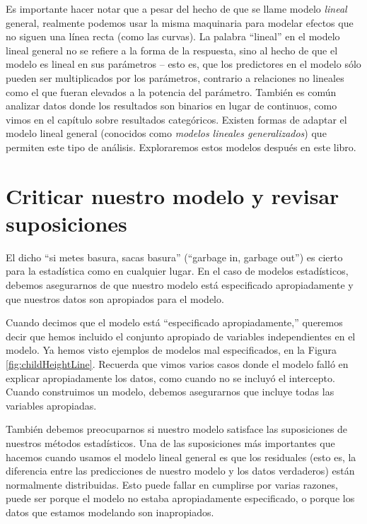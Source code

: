 \documentclass[
  12pt,
]{book}
\begin{document}
Es importante hacer notar que a pesar del hecho de que se llame modelo \emph{lineal} general, realmente podemos usar la misma maquinaria para modelar efectos que no siguen una línea recta (como las curvas). La palabra ``lineal'' en el modelo lineal general no se refiere a la forma de la respuesta, sino al hecho de que el modelo es lineal en sus parámetros -- esto es, que los predictores en el modelo sólo pueden ser multiplicados por los parámetros, contrario a relaciones no lineales como el que fueran elevados a la potencia del parámetro. También es común analizar datos donde los resultados son binarios en lugar de continuos, como vimos en el capítulo sobre resultados categóricos. Existen formas de adaptar el modelo lineal general (conocidos como \emph{modelos lineales generalizados}) que permiten este tipo de análisis. Exploraremos estos modelos después en este libro.

\hypertarget{model-criticism}{%
\section{Criticar nuestro modelo y revisar suposiciones}\label{model-criticism}}

El dicho ``si metes basura, sacas basura'' (``garbage in, garbage out'') es cierto para la estadística como en cualquier lugar. En el caso de modelos estadísticos, debemos asegurarnos de que nuestro modelo está especificado apropiadamente y que nuestros datos son apropiados para el modelo.

Cuando decimos que el modelo está ``especificado apropiadamente,'' queremos decir que hemos incluido el conjunto apropiado de variables independientes en el modelo. Ya hemos visto ejemplos de modelos mal especificados, en la Figura \ref{fig:childHeightLine}. Recuerda que vimos varios casos donde el modelo falló en explicar apropiadamente los datos, como cuando no se incluyó el intercepto. Cuando construimos un modelo, debemos asegurarnos que incluye todas las variables apropiadas.

También debemos preocuparnos si nuestro modelo satisface las suposiciones de nuestros métodos estadísticos. Una de las suposiciones más importantes que hacemos cuando usamos el modelo lineal general es que los residuales (esto es, la diferencia entre las predicciones de nuestro modelo y los datos verdaderos) están normalmente distribuidas. Esto puede fallar en cumplirse por varias razones, puede ser porque el modelo no estaba apropiadamente especificado, o porque los datos que estamos modelando son inapropiados.
\end{document}
